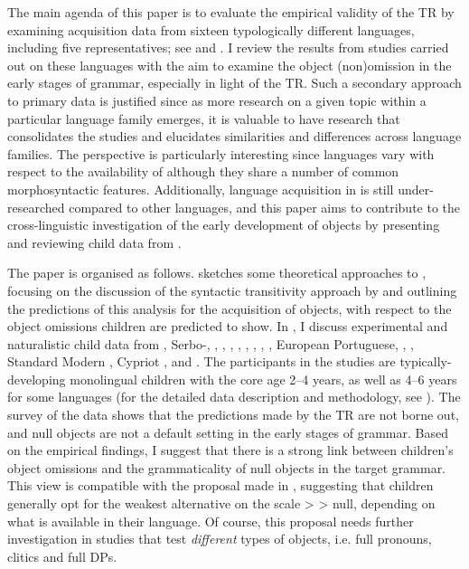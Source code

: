\documentclass[output=paper,modfonts,newtxmath,hidelinks,]{langscibook}
\begin{document}
The main agenda of this paper is to evaluate the empirical validity of the TR by examining acquisition data from sixteen typologically different languages, including five  representatives; see  and . I review the results from studies carried out on these languages with the aim to examine the object (non)omission in the early stages of grammar, especially in light of the TR. Such a secondary approach to primary data is justified since as more research on a given topic within a particular language family emerges, it is valuable to have research that consolidates the studies and elucidates similarities and differences across language families. The  perspective is particularly interesting since  languages vary with respect to the availability of  although they share a number of common morphosyntactic features. Additionally, language acquisition in  is still under-researched compared to other languages, and this paper aims to contribute to the cross-linguistic investigation of the early development of objects by presenting and reviewing child data from .

The paper is organised as follows.  sketches some theoretical approaches to , focusing on the discussion of the syntactic transitivity approach by \citet{Cummins-Roberge2005} and outlining the predictions of this analysis for the acquisition of objects, with respect to the object omissions children are predicted to show. In , I discuss experimental and naturalistic child data from , Serbo-, , , , , , , , , European Portuguese, , , Standard Modern , Cypriot , and . The participants in the studies are typically-developing monolingual children with the core age 2--4 years, as well as 4--6 years for some languages (for the detailed data description and methodology, see ). The survey of the data shows that the predictions made by the TR are not borne out, and null objects are not a default setting in the early stages of grammar. Based on the empirical findings, I suggest that there is a strong link between children’s object omissions and the grammaticality of null objects in the target grammar. This view is compatible with the proposal made in \citet{Varlokosta-etal2016}, suggesting that children generally opt for the weakest alternative on the scale  >  > null, depending on what is available in their language. Of course, this proposal needs further investigation in studies that test \textit{different} types of objects, i.e. full pronouns, clitics and full DPs.
\end{document}
